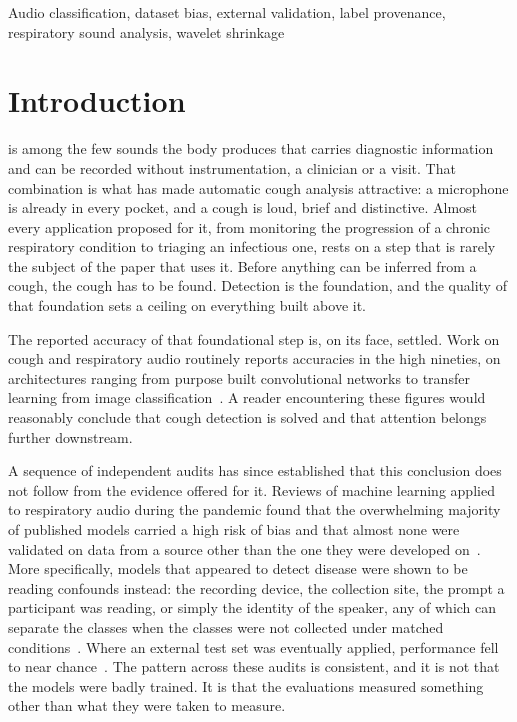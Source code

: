 \documentclass{ieeeaccess}
\newcommand{\parstart}[2]{\PARstart{#1}{#2}}
\begin{document}
\begin{keywords}
Audio classification, dataset bias, external validation, label provenance, respiratory
sound analysis, wavelet shrinkage
\end{keywords}

\titlepgskip=-15pt

\maketitle

\section{Introduction}\label{sec:intro}

\parstart{C}{oughing} is among the few sounds the body produces that carries diagnostic information and
can be recorded without instrumentation, a clinician or a visit. That combination is what
has made automatic cough analysis attractive: a microphone is already in every pocket, and
a cough is loud, brief and distinctive. Almost every application proposed for it, from
monitoring the progression of a chronic respiratory condition to triaging an infectious
one, rests on a step that is rarely the subject of the paper that uses it. Before anything
can be inferred from a cough, the cough has to be found. Detection is the foundation, and
the quality of that foundation sets a ceiling on everything built above it.

The reported accuracy of that foundational step is, on its face, settled. Work on cough
and respiratory audio routinely reports accuracies in the high nineties, on architectures
ranging from purpose built convolutional networks to transfer learning from image
classification~\cite{imran2020, laguarta2020, pahar2021}. A reader encountering these
figures would reasonably conclude that cough detection is solved and that attention
belongs further downstream.

A sequence of independent audits has since established that this conclusion does not
follow from the evidence offered for it. Reviews of machine learning applied to
respiratory audio during the pandemic found that the overwhelming majority of published
models carried a high risk of bias and that almost none were validated on data from a
source other than the one they were developed on~\cite{roberts2021}. More specifically,
models that appeared to detect disease were shown to be reading confounds instead: the
recording device, the collection site, the prompt a participant was reading, or simply the
identity of the speaker, any of which can separate the classes when the classes were not
collected under matched conditions~\cite{han2022, coppock2024}. Where an external test set
was eventually applied, performance fell to near chance~\cite{xia2021, zhou2021}. The
pattern across these audits is consistent, and it is not that the models were badly
trained. It is that the evaluations measured something other than what they were taken to
measure.
\end{document}
